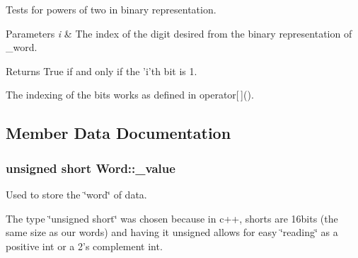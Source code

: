 Tests for powers of two in binary representation. 


\begin{DoxyParams}{Parameters}
{\em i} & The index of the digit desired from the binary representation of \_\-word. \\
\hline
\end{DoxyParams}
\begin{DoxyReturn}{Returns}
True if and only if the 'i'th bit is 1.
\end{DoxyReturn}
The indexing of the bits works as defined in operator\mbox{[}$\,$\mbox{]}(). 

\subsection{Member Data Documentation}
\hypertarget{classWord_a8b0aa1f2042266f307c51b3bdafa9128}{
\subsubsection[{\_\-value}]{\setlength{\rightskip}{0pt plus 5cm}unsigned short {\bf Word::\_\-value}}}
\label{classWord_a8b0aa1f2042266f307c51b3bdafa9128}


Used to store the \char`\"{}word\char`\"{} of data. 

The type \char`\"{}unsigned short\char`\"{} was chosen because in c++, shorts are 16bits (the same size as our words) and having it unsigned allows for easy \char`\"{}reading\char`\"{} as a positive int or a 2's complement int. 